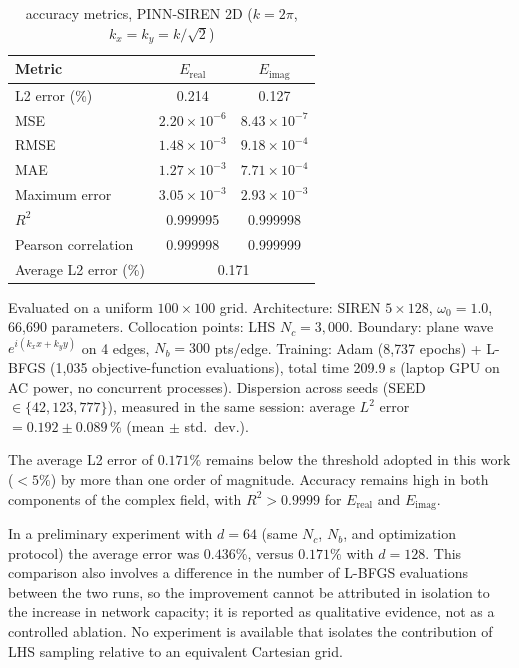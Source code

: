 \begin{table}[t]
\centering
\footnotesize
\renewcommand{\arraystretch}{1.2}
\setlength{\tabcolsep}{4pt}
\caption{accuracy metrics, PINN-SIREN 2D ($k = 2\pi$, $k_x = k_y = k/\sqrt{2}$)}
\label{tab:results2d}
\begin{tabular}{@{}lcc@{}}
\hline
Metric & $E_{\mathrm{real}}$ & $E_{\mathrm{imag}}$ \\
\hline
L2 error (\%)          & 0.214 & 0.127 \\
MSE                    & $2.20 \times 10^{-6}$ & $8.43 \times 10^{-7}$ \\
RMSE                   & $1.48 \times 10^{-3}$ & $9.18 \times 10^{-4}$ \\
MAE                    & $1.27 \times 10^{-3}$ & $7.71 \times 10^{-4}$ \\
Maximum error          & $3.05 \times 10^{-3}$ & $2.93 \times 10^{-3}$ \\
$R^2$                  & 0.999995 & 0.999998 \\
Pearson correlation    & 0.999998 & 0.999999 \\
\hline
Average L2 error (\%) & \multicolumn{2}{c}{0.171} \\
\hline
\end{tabular}
\end{table}
\noindent\footnotesize Evaluated on a uniform $100 \times 100$ grid.
Architecture: SIREN $5 \times 128$, $\omega_0 = 1.0$, 66{,}690 parameters.
Collocation points: LHS $N_c = 3{,}000$.
Boundary: plane wave $e^{i(k_x x + k_y y)}$ on 4 edges, $N_b = 300$ pts/edge.
Training: Adam (8{,}737 epochs) + L-BFGS (1{,}035 objective-function
evaluations), total time 209.9 s (laptop GPU on AC power, no concurrent
processes).
Dispersion across seeds (SEED $\in \{42, 123, 777\}$), measured in the
same session:
average $L^2$ error $= 0.192 \pm 0.089$\,\% (mean $\pm$ std.\ dev.).
\normalsize

The average L2 error of $0.171\%$ remains below the threshold adopted in this work
($< 5\%$) by more than one order of magnitude. Accuracy remains high in both
components of the complex field, with $R^2 > 0.9999$ for $E_{\mathrm{real}}$ and
$E_{\mathrm{imag}}$.

In a preliminary experiment with $d = 64$ (same $N_c$, $N_b$, and optimization
protocol) the average error was $0.436\%$, versus $0.171\%$ with $d = 128$.
This comparison also involves a difference in the number of L-BFGS
evaluations between the two runs, so the improvement cannot be attributed
in isolation to the increase in network capacity; it is reported as
qualitative evidence, not as a controlled ablation. No experiment is
available that isolates the contribution of LHS sampling relative to an
equivalent Cartesian grid.

